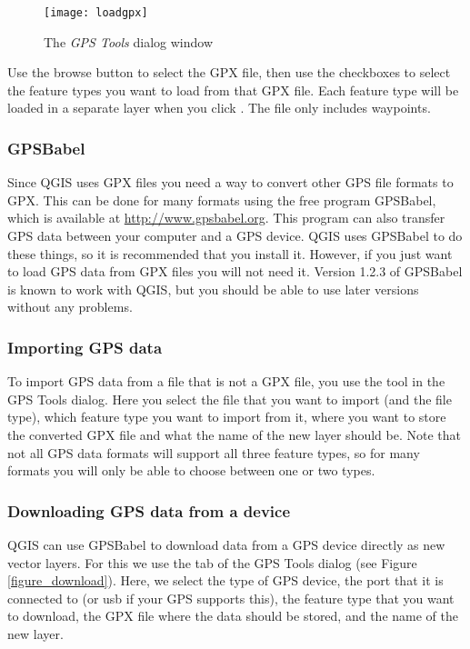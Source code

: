 \begin{figure}[ht]
   \begin{center}
\caption{\label{gpxloader}The \emph{GPS Tools} dialog window \nixcaption}
\texttt{[image: loadgpx]}
\end{center}
\end{figure}

Use the browse button \browsebutton to select the GPX file, then use the
checkboxes to select the feature types you want to load from that GPX file.
Each feature type will be loaded in a separate layer when you click .
The file  only includes waypoints.

\subsubsection{GPSBabel}

Since QGIS uses GPX files you need a way to convert other GPS file formats to GPX.
This can be done for many formats using the free program GPSBabel, which is available at \url{http://www.gpsbabel.org}.
This program can also transfer GPS data between your computer and a GPS device.
QGIS uses GPSBabel to do these things, so it is recommended that you install it.
However, if you just want to load GPS data from GPX files you will not need it.
Version 1.2.3 of GPSBabel is known to work with QGIS, but you should be able to use later versions without
any problems.


\subsubsection{Importing GPS data}

To import GPS data from a file that is not a GPX file, you use the tool  in the GPS Tools dialog.
Here you select the file that you want to import (and the file type), which feature type you want to import from it, where you want to store the converted GPX file and what the name of the new layer should be.  Note that not all GPS 
data formats will support all three feature types, so for many formats 
you will only be able to choose between one or two types. 

\subsubsection{Downloading GPS data from a device}

QGIS can use GPSBabel to download data from a GPS device directly as new vector layers.
For this we use the  tab of the GPS Tools dialog (see Figure \ref{figure_download}). Here, we 
select the type of GPS device, the port that it is connected to (or usb if your GPS supports this), the feature type that you want to download, the GPX file where the data should be stored, and the name of the new layer.

